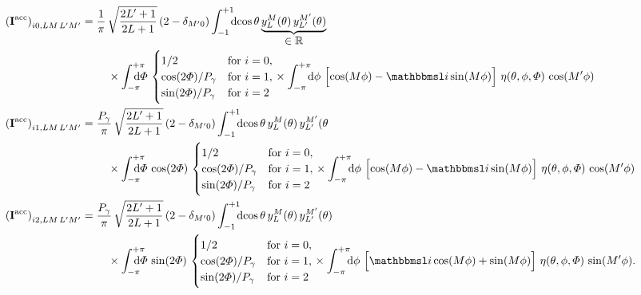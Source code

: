 \begin{align}
  \label{eq:photoprod_integral_matrix_detail_0}
  \rBrk[0]{\mat{I}^\text{acc}}_{i 0, L M\, L' M'}
  ={}&
  \begin{multlined}[t]
    \frac{1}{\pi}\, \sqrt{\dfrac{2 L' + 1}{2 L + 1}}\, (2 - \delta_{M' 0})
    \int_{-1}^{+1}\!\!\! \dif{\cos \theta}\,
    \dUnderbrace{y_L^M(\theta)\, y_{L'}^{M'}(\theta)}{\in \mathbb{R}}
    \\
    \times
    \int_{-\pi}^{+\pi}\hspace{-1.2em} \dif{\Phi}\, \begin{cases}
      1 / 2 & \text{for $i = 0$}, \\
      \cos(2 \Phi) / P_\gamma & \text{for $i = 1$}, \\
      \sin(2 \Phi) / P_\gamma & \text{for $i = 2$}
    \end{cases}
    \times
    \int_{-\pi}^{+\pi}\!\!\! \dif{\phi}\,
    \sBrk[2]{\cos(M \phi) - \imag \sin(M \phi)}\, \eta(\theta, \phi, \Phi)\, \cos(M' \phi)
  \end{multlined}
  \\
  \label{eq:photoprod_integral_matrix_detail_1}
  \rBrk[0]{\mat{I}^\text{acc}}_{i 1, L M\, L' M'}
  ={}&
  \begin{multlined}[t]
    \frac{P_\gamma}{\pi}\, \sqrt{\dfrac{2 L' + 1}{2 L + 1}}\, (2 - \delta_{M' 0})
    \int_{-1}^{+1}\!\!\! \dif{\cos \theta}\,
    y_L^M(\theta)\, y_{L'}^{M'}(\theta
    \\
    \times
    \int_{-\pi}^{+\pi}\hspace{-1.2em} \dif{\Phi}\, \cos(2 \Phi)\, \begin{cases}
      1 / 2 & \text{for $i = 0$}, \\
      \cos(2 \Phi) / P_\gamma & \text{for $i = 1$}, \\
      \sin(2 \Phi) / P_\gamma & \text{for $i = 2$}
    \end{cases}
    \times
    \int_{-\pi}^{+\pi}\!\!\! \dif{\phi}\,
    \sBrk[2]{\cos(M \phi) - \imag \sin(M \phi)}\, \eta(\theta, \phi, \Phi)\, \cos(M' \phi)
  \end{multlined}
  \\
  \label{eq:photoprod_integral_matrix_detail_2}
  \rBrk[0]{\mat{I}^\text{acc}}_{i 2, L M\, L' M'}
  ={}&
  \begin{multlined}[t]
    \frac{P_\gamma}{\pi}\, \sqrt{\dfrac{2 L' + 1}{2 L + 1}}\, (2 - \delta_{M' 0})
    \int_{-1}^{+1}\!\!\! \dif{\cos \theta}\,
    y_L^M(\theta)\, y_{L'}^{M'}(\theta)
    \\
    \times
    \int_{-\pi}^{+\pi}\hspace{-1.2em} \dif{\Phi}\, \sin(2 \Phi)\, \begin{cases}
      1 / 2 & \text{for $i = 0$}, \\
      \cos(2 \Phi) / P_\gamma & \text{for $i = 1$}, \\
      \sin(2 \Phi) / P_\gamma & \text{for $i = 2$}
    \end{cases}
    \times
    \int_{-\pi}^{+\pi}\!\!\! \dif{\phi}\,
    \sBrk[2]{\imag \cos(M \phi) + \sin(M \phi)}\, \eta(\theta, \phi, \Phi)\, \sin(M' \phi).
  \end{multlined}
\end{align}
